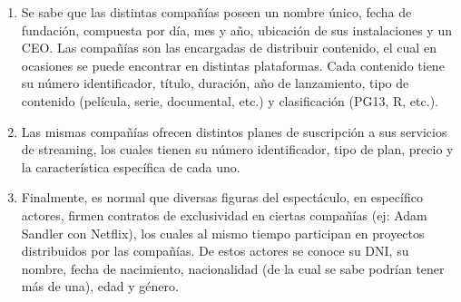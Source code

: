\documentclass[letterpaper]{article}
\begin{document}
\begin{enumerate}

\item	Se sabe que las distintas compañías poseen un nombre único, fecha de fundación, compuesta por día, mes y año, ubicación de sus instalaciones y un CEO. Las compañías son las encargadas de distribuir contenido, el cual en ocasiones se puede encontrar en distintas plataformas. Cada contenido tiene su número identificador, título, duración, año de lanzamiento, tipo de contenido (película, serie, documental, etc.) y clasificación (PG13, R, etc.).

\item	Las mismas compañías ofrecen distintos planes de suscripción a sus servicios de streaming, los cuales tienen su número identificador, tipo de plan, precio y la característica específica de cada uno.

\item	Finalmente, es normal que diversas figuras del espectáculo, en específico actores, firmen contratos de exclusividad en ciertas compañías (ej: Adam Sandler con Netflix), los cuales al mismo tiempo participan en proyectos distribuidos por las compañías. De estos actores se conoce su DNI, su nombre, fecha de nacimiento, nacionalidad (de la cual se sabe podrían tener más de una), edad y género.

\end{enumerate}
\end{document}
